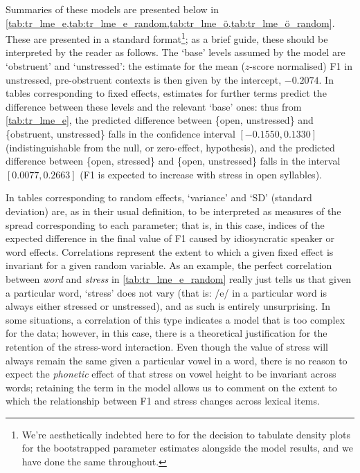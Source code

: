 Summaries of these models are presented below in \cref{tab:tr_lme_e,tab:tr_lme_e_random,tab:tr_lme_ö,tab:tr_lme_ö_random}. These are presented in a standard format\footnote{We're aesthetically indebted here to \cite{Fruehwald2016} for the decision to tabulate density plots for the bootstrapped parameter estimates alongside the model results, and we have done the same throughout.}; as a brief guide, these should be interpreted by the reader as follows. The `base' levels assumed by the model are `obstruent' and `unstressed': the estimate for the mean ($z$-score normalised) F1 in unstressed, pre-obstruent contexts is then given by the intercept, $-0.2074$. In tables corresponding to fixed effects, estimates for further terms predict the difference between these levels and the relevant `base' ones: thus from \cref{tab:tr_lme_e}, the predicted difference between \{open, unstressed\} and \{obstruent, unstressed\} falls in the confidence interval $[-0.1550, 0.1330]$ (indistinguishable from the null, or zero-effect, hypothesis), and the predicted difference between \{open, stressed\} and \{open, unstressed\} falls in the interval $[0.0077, 0.2663]$ (F1 is expected to increase with stress in open syllables).

In tables corresponding to random effects, `variance' and `SD' (standard deviation) are, as in their usual definition, to be interpreted as measures of the spread corresponding to each parameter; that is, in this case, indices of the expected difference in the final value of F1 caused by idiosyncratic speaker or word effects. Correlations represent the extent to which a given fixed effect is invariant for a given random variable. As an example, the perfect correlation between \emph{word} and \emph{stress} in \cref{tab:tr_lme_e_random} really just tells us that given a particular word, `stress' does not vary (that is: /e/ in a particular word is always either stressed or unstressed), and as such is entirely unsurprising. In some situations, a correlation of this type indicates a model that is too complex for the data; however, in this case, there is a theoretical justification for the retention of the stress-word interaction. Even though the value of stress will always remain the same given a particular vowel in a word, there is no reason to expect the \emph{phonetic} effect of that stress on vowel height to be invariant across words; retaining the term in the model allows us to comment on the extent to which the relationship between F1 and stress changes across lexical items.

